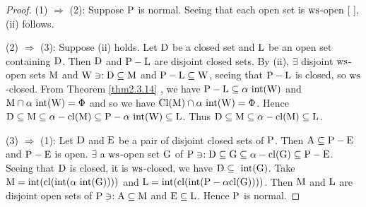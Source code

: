 \begin{proof}
(1) $\Rightarrow$ (2): Suppose $\mathrm{P}$ is normal. Seeing that each open set is $\mathrm{ws}$-open [ ], (ii) follows.

(2) $\Rightarrow$ (3): Suppose (ii) holds. Let $\mathrm{D}$ be a closed set and $\mathrm{L}$ be an open set containing $\mathrm{D}$. Then $\mathrm{D}$ and $\mathrm{P} -\mathrm{L}$ are disjoint closed sets. By (ii), $\exists$  disjoint $\mathrm{ws}$-open sets $\mathrm{M}$ and $\mathrm{W} \ni: \mathrm{D}\subseteq \mathrm{M}$ and $\mathrm{P}-\mathrm{L} \subseteq \mathrm{W}$, seeing that $\mathrm{P} -\mathrm{L}$ is closed, so $\mathrm{ws}$-closed. From Theorem \ref{thm2.3.14} \cite{key2}, we have $\mathrm{P} -\mathrm{L} \subseteq \alpha\text{ int} (\mathrm{W})$ and $\mathrm{M} \cap \alpha\text{ int} (\mathrm{W}) = \Phi$ and so we have $\mathrm{Cl} (\mathrm{M}) \cap \alpha\text{ int} (\mathrm{W}) = \Phi$. Hence $\mathrm{D} \subseteq \mathrm{M} \subseteq \alpha-\mathrm{cl}(\mathrm{M}) \subseteq \mathrm{P} -\alpha\text{ int}(\mathrm{W}) \subseteq \mathrm{L}$. Thus $\mathrm{D}\subseteq\mathrm{M} \subseteq \alpha-\mathrm{cl} (\mathrm{M}) \subseteq \mathrm{L}$.

(3) $\Rightarrow$ (1): Let $\mathrm{D}$ and $\mathrm{E}$ be a pair of disjoint closed sets of $\mathrm{P}$. Then $\mathrm{A} \subseteq \mathrm{P}-\mathrm{E}$ and $\mathrm{P}-\mathrm{E}$ is open. $\exists$ a $\mathrm{ws}$-open set $\mathrm{G}$ of $\mathrm{P} \ni: \mathrm{D} \subseteq \mathrm{G} \subseteq \alpha-\mathrm{cl} (\mathrm{G}) \subseteq \mathrm{P}-\mathrm{E}$. Seeing that $\mathrm{D}$ is closed, it is $\mathrm{ws}$-closed, we have $\mathrm{D} \subseteq \text{ int} (\mathrm{G})$. Take $\mathrm{M} =\text{int} (\mathrm{cl} (\text{int} (\alpha\text{ int} (\mathrm{G}))))$ and $\mathrm{L} = \text{int} (\mathrm{cl} (\text{int}(\mathrm{P}-\alpha\mathrm{cl} (\mathrm{G}))))$. Then $\mathrm{M}$ and $\mathrm{L}$ are disjoint open sets of $\mathrm{P} \ni: \mathrm{A} \subseteq \mathrm{M}$ and $\mathrm{E} \subseteq \mathrm{L}$. Hence $\mathrm{P}$ is normal.
\end{proof}
